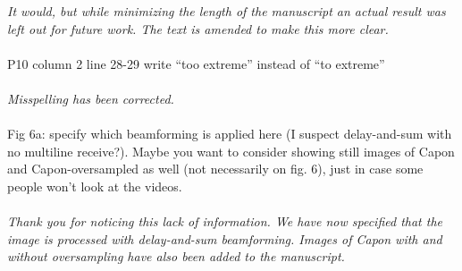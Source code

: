 \documentclass{article}
\begin{document}
\textit{It would, but while minimizing the length of the manuscript an actual result was left out for future work. The text is amended to make this more clear.}
\\\\
P10 column 2 line 28-29 write “too extreme” instead of “to extreme”
\\\\
\textit{Misspelling has been corrected.}
\\\\
Fig 6a: specify which beamforming is applied here (I suspect delay-and-sum with no multiline receive?). Maybe you want to consider showing still images of Capon and Capon-oversampled as well (not necessarily on fig. 6), just in case some people won’t look at the videos.
\\\\
\textit{Thank you for noticing this lack of information. We have now specified that the image is processed with delay-and-sum beamforming. Images of Capon with and without oversampling have also been added to the manuscript.}
\end{document}
